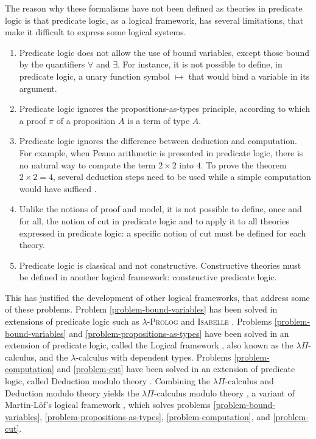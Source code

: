 \documentclass[english]{lipics}
\newcommand\fa{\forall}
\newcommand\ex{\exists}
\begin{document}
The reason why these formalisms have not been defined as theories in
predicate logic is that predicate logic, as a logical framework, has
several limitations, that make it difficult to express some logical
systems.
\begin{enumerate}
\item\label{problem-bound-variables} Predicate logic does not allow
  the use of bound variables, except those bound by the quantifiers
  $\fa$ and $\ex$. For instance, it is not possible to define, in
  predicate logic, a unary function symbol $\mapsto$ that would bind
  a variable in its argument.

\item\label{problem-propositions-as-types} Predicate logic ignores the
  propositions-as-types principle, according to which a proof $\pi$ of
  a proposition $A$ is a term of type $A$.

\item\label{problem-computation} Predicate logic ignores the
  difference between deduction and computation. For example, when
  Peano arithmetic is presented in predicate logic, there is no
  natural way to compute the term $2 \times 2$ into $4$. To prove the
  theorem $2 \times 2 = 4$, several deduction steps need to be used
  while a simple computation would have sufficed \cite{Poincare}.

\item\label{problem-cut} Unlike the notions of proof and model, it is
  not possible to define, once and for all, the notion of cut in
  predicate logic and to apply it to all theories expressed in
  predicate logic: a specific notion of cut must be defined for each
  theory.

\item\label{problem-classical} Predicate logic is classical and not
  constructive. Constructive theories must be defined in another
  logical framework: constructive predicate logic.
\end{enumerate}

This has justified the development of other logical frameworks, that
address some of these problems.  Problem \ref{problem-bound-variables}
has been solved in extensions of predicate logic such as
\textsc{$\lambda$-Prolog} \cite{MillerNadathur} and \textsc{Isabelle}
\cite{Paulson}.
Problems \ref{problem-bound-variables} and
\ref{problem-propositions-as-types} have been solved in an extension
of predicate logic, called the Logical framework \cite{HHP}, also
known as the $\lambda \Pi$-calculus, and the $\lambda$-calculus with
dependent types.  Problems \ref{problem-computation} and
\ref{problem-cut} have been solved in an extension of predicate logic,
called Deduction modulo theory \cite{DHK}.  Combining the $\lambda
\Pi$-calculus and Deduction modulo theory yields the $\lambda
\Pi$-calculus modulo theory \cite{CousineauDowek}, a variant of
Martin-L\"of's logical framework \cite{NPS}, which solves problems
\ref{problem-bound-variables}, \ref{problem-propositions-as-types},
\ref{problem-computation}, and \ref{problem-cut}.
\end{document}
